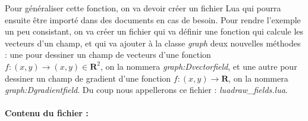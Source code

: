 \documentclass[%
10pt,%
a4paper,%
french,%
]%
{article}%
\begin{document}
Pour généraliser cette fonction, on va devoir créer un fichier Lua qui pourra ensuite être importé dans des documents en cas de besoin. Pour rendre l'exemple un peu consistant, on va créer un fichier qui va définir une fonction qui calcule les vecteurs d'un champ, et qui va ajouter à la classe \emph{graph} deux nouvelles méthodes : une pour dessiner un champ de vecteurs d'une fonction $f\colon(x,y)\to(x,y)\in \mathbf R^2$, on la nommera \emph{graph:Dvectorfield}, et une autre pour dessiner un champ de gradient d'une fonction $f\colon(x,y)\to\mathbf R$, on la nommera \emph{graph:Dgradientfield}. Du coup nous appellerons ce fichier : \emph{luadraw\_fields.lua}.

\paragraph{Contenu du fichier :}
\end{document}
